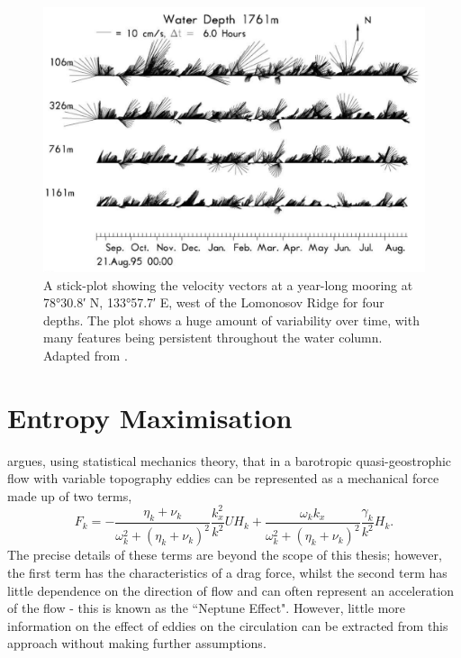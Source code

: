 \documentclass[12pt,a4paper]{report}
\begin{document}
\begin{figure}
	\centering
	\includegraphics[width=\linewidth]{Woodgate2001Mooring}
	\caption[Adapted from \cite{woodgate2001arctic}]{A  stick-plot showing the velocity vectors at 
		a year-long mooring at \ang{78;30.8;} N, \ang{133;57.7;} E, west of the Lomonosov Ridge for four depths.  The plot shows a huge amount of variability over time, with many
		features being persistent throughout the water column. Adapted from \cite{woodgate2001arctic}.}
	\label{fig:Woodgate2001Mooring}
\end{figure}

  
                      \section{Entropy  Maximisation}
                      \label{entropy}
                     
                	
                	\cite{holloway1987systematic} argues, using statistical mechanics theory, 
                	that in a barotropic quasi-geostrophic flow with variable topography 
                	eddies can be represented as a mechanical force made up of two terms,
                	\begin{equation*}
                	F_{k}=-\frac{\eta_{k}+\nu_{k}}{\omega_{k}^{2}
                		+\left(\eta_{k}+\nu_{k}\right)^{2}}\frac{k_{x}^{2}}{k^{2}}UH_{k}
                	+\frac{\omega_{k}k_{x}}{\omega_{k}^{2}
                		+\left(\eta_{k}+\nu_{k}\right)^{2}}\frac{\gamma_{k}}{k^{2}}H_{k}.
                	\end{equation*} 
                	The precise details of these terms are beyond the scope of this
                	thesis; however, the first term has the characteristics of a drag
                	force, whilst the second term has little dependence on the direction
                	of flow and can often represent an acceleration of the flow
                	- this is known as the ``Neptune Effect". However,
                	little more information on the effect of eddies on the circulation
                	can be extracted from this approach without making further
                	assumptions.  
                	
\end{document}
